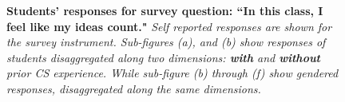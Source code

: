 \documentclass[oneside,titlepage,numbers=noenddot,headinclude,%
               footinclude=true,cleardoublepage=empty,abstractoff,BCOR=2mm,%
               paper=a4,fontsize=11pt,ngerman,american]{scrreprt}
\numberwithin{theorem}{chapter}
\numberwithin{definition}{chapter}
\numberwithin{algorithm}{chapter}
\numberwithin{figure}{chapter}
\numberwithin{table}{chapter}
\numberwithin{equation}{chapter}
\begin{document}
\begin{figure}[!htbp]
{    \label{fig:blg_3_female_CS}}
\caption{\textbf{Students' responses for survey question: ``In this class, I feel like my ideas count."} \textit{Self reported responses are shown for the survey instrument. Sub-figures (a), and (b) show responses of students disaggregated along two dimensions: \textbf{with} and \textbf{without} prior CS experience. While sub-figure (b) through (f) show gendered responses, disaggregated along the same dimensions.}}
\label{blg_3_dis}
\end{figure}


\end{document}
